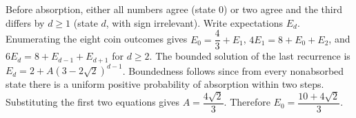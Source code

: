 Before absorption, either all numbers agree (state 0) or two agree and the third differs by $d\ge1$ (state $d$, with sign irrelevant). Write expectations $E_d$. Enumerating the eight coin outcomes gives $E_0 = \dfrac{4}{3} + E_1$, $4E_1=8+E_0+E_2$, and $6E_d=8+E_{d-1}+E_{d+1}$ for $d\ge2$. The bounded solution of the last recurrence is $E_d=2+A(3-2\sqrt2)^{d-1}$. Boundedness follows since from every nonabsorbed state there is a uniform positive probability of absorption within two steps. Substituting the first two equations gives $A = \dfrac{4 \sqrt{2}}{3}$. Therefore $\boxed{E_0 = \dfrac{10+4\sqrt2}{3}}$.

